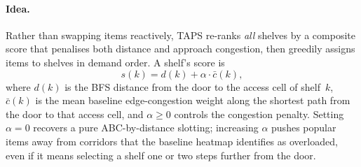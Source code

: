 \documentclass[12pt,a4paper]{article}
\begin{document}
\paragraph{Idea.}
Rather than swapping items reactively, TAPS re-ranks \emph{all} shelves by a composite
score that penalises both distance and approach congestion, then greedily assigns
items to shelves in demand order.
A shelf's score is
\[
  s(k) = d(k) + \alpha \cdot \bar{c}(k),
\]
where $d(k)$ is the BFS distance from the door to the access cell of shelf~$k$,
$\bar{c}(k)$ is the mean baseline edge-congestion weight along the shortest path
from the door to that access cell, and $\alpha \ge 0$ controls the congestion
penalty.
Setting $\alpha = 0$ recovers a pure ABC-by-distance slotting;
increasing $\alpha$ pushes popular items away from corridors that the baseline
heatmap identifies as overloaded, even if it means selecting a shelf one or two
steps further from the door.
\end{document}

